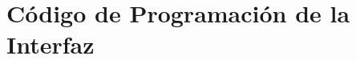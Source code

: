 \chapter{Código de Programación de la Interfaz}
\label{an:Annex_G_CodigoINter}

\cleardoublepage
%     
%
%
